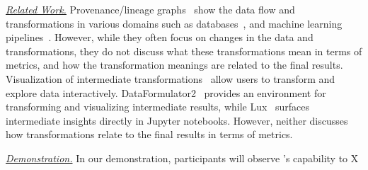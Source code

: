 \smallskip \noindent \emph{\underline{Related Work.}} 
Provenance/lineage graphs~\cite{DBLP:journals/tods/ChapmanLMT24,
DBLP:journals/tvcg/CaiGXYWXWLW25,DBLP:conf/deem/PinaCK0M24} show the data flow
and transformations in various domains such as
databases~\cite{DBLP:journals/corr/abs-0912-5340, DBLP:conf/icdt/BunemanKT01},
and machine learning pipelines~\cite{DBLP:conf/deem/PinaCK0M24,
DBLP:journals/tods/ChapmanLMT24}. However, while they often focus on changes in
the data and transformations, they do not discuss what these transformations
mean in terms of metrics, and how the transformation meanings are related to the
final results. 
Visualization of intermediate
transformations~\cite{DBLP:journals/pvldb/LeeTABCKMSYHP21,
DBLP:conf/chi/WangLDM025} allow users to transform and explore data
interactively. DataFormulator2~\cite{DBLP:conf/chi/WangLDM025} provides an
environment for transforming and visualizing intermediate results, while
Lux~\cite{DBLP:journals/pvldb/LeeTABCKMSYHP21} surfaces intermediate insights
directly in Jupyter notebooks. However, neither discusses how transformations
relate to the final results in terms of metrics.

\smallskip \noindent \emph{\underline{Demonstration.}} In our demonstration,
participants will observe \clue's capability to X